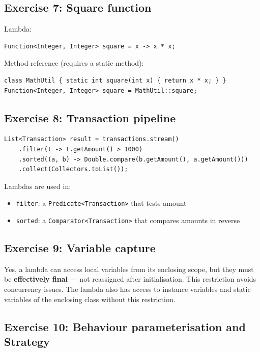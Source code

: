 \documentclass[twoside=false,DIV=14]{scrartcl}
\begin{document}
\subsection*{Exercise 7: Square function}

Lambda:
\begin{lstlisting}
Function<Integer, Integer> square = x -> x * x;
\end{lstlisting}

Method reference (requires a static method):
\begin{lstlisting}
class MathUtil { static int square(int x) { return x * x; } }
Function<Integer, Integer> square = MathUtil::square;
\end{lstlisting}

\subsection*{Exercise 8: Transaction pipeline}

\begin{lstlisting}
List<Transaction> result = transactions.stream()
    .filter(t -> t.getAmount() > 1000)
    .sorted((a, b) -> Double.compare(b.getAmount(), a.getAmount()))
    .collect(Collectors.toList());
\end{lstlisting}

Lambdas are used in:
\begin{itemize}
\item \texttt{filter}: a \texttt{Predicate<Transaction>} that tests amount
\item \texttt{sorted}: a \texttt{Comparator<Transaction>} that compares amounts in reverse
\end{itemize}

\subsection*{Exercise 9: Variable capture}

Yes, a lambda can access local variables from its enclosing scope, but they must be \textbf{effectively final} --- not reassigned after initialisation.  This restriction avoids concurrency issues.  The lambda also has access to instance variables and static variables of the enclosing class without this restriction.

\subsection*{Exercise 10: Behaviour parameterisation and Strategy}
\end{document}
